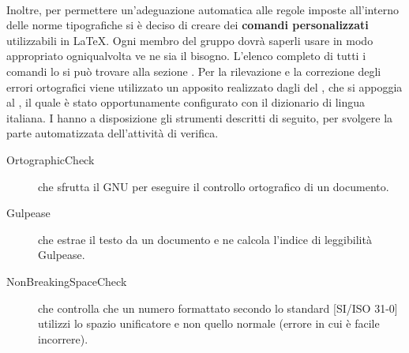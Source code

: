 		\\
		Inoltre, per permettere un’adeguazione automatica alle regole imposte all’interno delle norme tipografiche si è deciso di creare dei \textbf{comandi personalizzati} utilizzabili in \LaTeX{}. Ogni membro del gruppo dovrà saperli usare in modo appropriato ogniqualvolta ve ne sia il bisogno. L’elenco completo di tutti i comandi lo si può trovare alla sezione .
		Per la rilevazione e la correzione degli errori ortografici viene utilizzato un apposito  realizzato dagli  del \groupname{}, che si appoggia al  , il quale è stato opportunamente configurato con il dizionario di lingua italiana.
		I  hanno a disposizione gli strumenti descritti di seguito, per svolgere la parte automatizzata dell'attività di verifica.
		\begin{description}
			\item[OrtographicCheck]  che sfrutta il  GNU  per eseguire il controllo ortografico di un documento.
			\item[Gulpease]  che estrae il testo da un documento e ne calcola l'indice di leggibilità Gulpease.
			\item[NonBreakingSpaceCheck]  che controlla che un numero formattato secondo lo standard [SI/ISO 31-0] utilizzi lo spazio unificatore e non quello normale (errore in cui è facile incorrere).
		\end{description}

